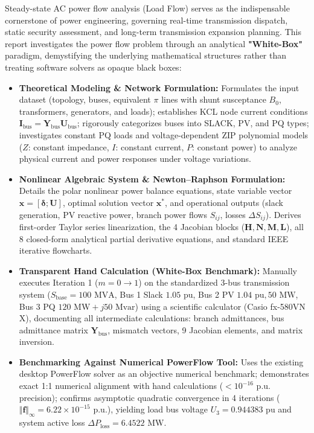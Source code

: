\documentclass[12pt,a4paper,oneside]{report}
\begin{document}
Steady-state AC power flow analysis (Load Flow) serves as the indispensable cornerstone of power engineering, governing real-time transmission dispatch, static security assessment, and long-term transmission expansion planning. This report investigates the power flow problem through an analytical \textbf{"White-Box"} paradigm, demystifying the underlying mathematical structures rather than treating software solvers as opaque black boxes:
\begin{itemize}
    \item \textbf{Theoretical Modeling \& Network Formulation:} Formulates the input dataset (topology, buses, equivalent $\pi$ lines with shunt susceptance $B_0$, transformers, generators, and loads); establishes KCL node current conditions $\mathbf{I}_{\text{bus}} = \mathbf{Y}_{\text{bus}}\mathbf{U}_{\text{bus}}$; rigorously categorizes buses into SLACK, PV, and PQ types; investigates constant PQ loads and voltage-dependent ZIP polynomial models ($Z$: constant impedance, $I$: constant current, $P$: constant power) to analyze physical current and power responses under voltage variations.
    \item \textbf{Nonlinear Algebraic System \& Newton--Raphson Formulation:} Details the polar nonlinear power balance equations, state variable vector $\mathbf{x} = [\boldsymbol{\delta}; \mathbf{U}]$, optimal solution vector $\mathbf{x}^*$, and operational outputs (slack generation, PV reactive power, branch power flows $S_{ij}$, losses $\Delta S_{ij}$). Derives first-order Taylor series linearization, the 4 Jacobian blocks ($\mathbf{H}, \mathbf{N}, \mathbf{M}, \mathbf{L}$), all 8 closed-form analytical partial derivative equations, and standard IEEE iterative flowcharts.
    \item \textbf{Transparent Hand Calculation (White-Box Benchmark):} Manually executes Iteration 1 ($m = 0 \to 1$) on the standardized 3-bus transmission system ($S_{\text{base}} = 100\text{ MVA}$, Bus 1 Slack $1.05\text{ pu}$, Bus 2 PV $1.04\text{ pu}, 50\text{ MW}$, Bus 3 PQ $120\text{ MW} + j50\text{ Mvar}$) using a scientific calculator (Casio fx-580VN X), documenting all intermediate calculations: branch admittances, bus admittance matrix $\mathbf{Y}_{\text{bus}}$, mismatch vectors, 9 Jacobian elements, and matrix inversion.
    \item \textbf{Benchmarking Against Numerical PowerFlow Tool:} Uses the existing desktop PowerFlow solver as an objective numerical benchmark; demonstrates exact 1:1 numerical alignment with hand calculations ($< 10^{-16}\text{ p.u.}$ precision); confirms asymptotic quadratic convergence in 4 iterations ($\Vert \mathbf{f} \Vert_\infty = 6.22 \times 10^{-15}\text{ p.u.}$), yielding load bus voltage $U_3 = 0.944383\text{ pu}$ and system active loss $\Delta P_{\text{loss}} = 6.4522\text{ MW}$.

\end{itemize}
\end{document}
